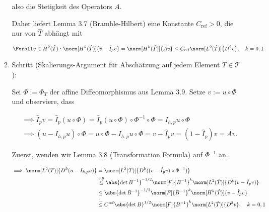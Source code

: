 \begin{solution}
\begin{enumerate}[label = \textbf{\alph*)}]
\begin{enumerate}[label = \arabic*.]
    also die Stetigkeit des Operators $A$.


    Daher liefert Lemma 3.7 (Bramble-Hilbert) eine Konstante $C_\mathrm{ref} > 0$, die nur von $\hat T$ abhängt mit

    \begin{align*}
      \Forall v \in H^2(\hat T):
      \norm[H^k(\hat T)]{v - \hat I_p v}
      =
      \norm[H^k(\hat T)]{A v}
      \leq
      C_\mathrm{ref}
      \norm[L^2(\hat T)]{D^2 v},
      \quad
      k = 0, 1.
    \end{align*}

    \item Schritt (Skalierungs-Argument für Abschätzung auf jedem Element $T \in \mathcal{T}$):

    Sei $\Phi := \Phi_T$ der affine Diffeomorphismus aus Lemma 3.9.
    Setze $v := u \circ \Phi$ und observiere, dass

    \begin{align*}
      & \implies
      \hat I_p v
      =
      \hat I_p (u \circ \Phi)
      =
      \hat I_p (u \circ \Phi) \circ \Phi^{-1} \circ \Phi
      =
      I_{h, p} u \circ \Phi \\
      & \implies
      (u - I_{h, p} u) \circ \Phi
      =
      u \circ \Phi - I_{h, p} u \circ \Phi
      =
      v - \hat I_p v
      =
      (1 - \hat I_p) v
      =
      A v.
    \end{align*}

    Zuerst, wenden wir Lemma 3.8 (Transformation Formula) auf $\Phi^{-1}$ an.


    \begin{align*}
      \implies
      \norm[L^2(T)]{D^k (u - I_{h, p} u)}
      & =
      \norm[L^2(T)]{D^k ((v - \hat I_p v) \circ \Phi^{-1})} \\
      & \stackrel
      {
        \mathrm{3.8}
      }{\leq}
      \abs{\det B^{-1}}^{-1/2} \norm[F]{B^{-1}}^k \norm[L^2(\hat T)]{D^k (v - \hat I_p v)} \\
      & \leq
      \abs{\det B^{-1}}^{-1/2} \norm[F]{B^{-1}}^k \norm[H^k(\hat T)]{v - \hat I_p v} \\
      & \stackrel
      {
        \mathrm{1.}
      }{\leq}
      C^\mathrm{ref} \abs{\det B}^{1/2} \norm[F]{B^{-1}}^k \norm[L^2(\hat T)]{D^2 v},
      \quad
      k = 0, 1
    \end{align*}


\end{enumerate}
\end{enumerate}
\end{solution}
